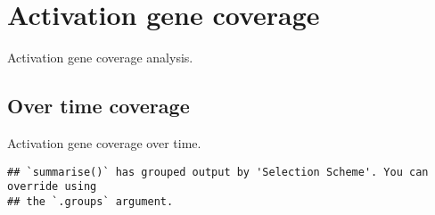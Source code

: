 \documentclass[]{book}
\newenvironment{Shaded}{\begin{snugshade}}{\end{snugshade}}
\newcommand{\CharTok}[1]{\textcolor[rgb]{0.31,0.60,0.02}{#1}}
\newcommand{\DataTypeTok}[1]{\textcolor[rgb]{0.13,0.29,0.53}{#1}}
\newcommand{\KeywordTok}[1]{\textcolor[rgb]{0.13,0.29,0.53}{\textbf{#1}}}
\newcommand{\NormalTok}[1]{#1}
\newcommand{\OperatorTok}[1]{\textcolor[rgb]{0.81,0.36,0.00}{\textbf{#1}}}
\newcommand{\StringTok}[1]{\textcolor[rgb]{0.31,0.60,0.02}{#1}}
\begin{document}
\hypertarget{activation-gene-coverage}{%
\section{Activation gene coverage}\label{activation-gene-coverage}}

Activation gene coverage analysis.

\hypertarget{over-time-coverage}{%
\subsection{Over time coverage}\label{over-time-coverage}}

Activation gene coverage over time.

\begin{Shaded}
\end{Shaded}

\begin{verbatim}
## `summarise()` has grouped output by 'Selection Scheme'. You can override using
## the `.groups` argument.
\end{verbatim}
\end{document}
